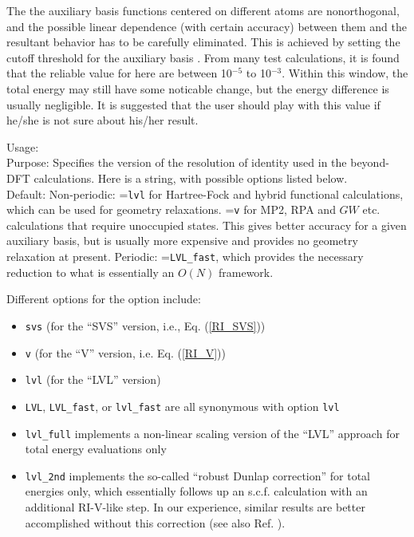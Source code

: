   The the auxiliary basis functions centered on different atoms are nonorthogonal,
  and the possible linear dependence (with certain accuracy) between them 
  and the resultant behavior has to be carefully eliminated. This is achieved by
  setting the cutoff threshold for the auxiliary basis .
  From many test calculations, it is found that the reliable value for 
   here are between 10$^{-5}$ to 10$^{-3}$. Within this window,
   the total energy may still have some noticable change, but the energy difference 
   is usually negligible. It is suggested that the user should play with this
   value if he/she is not sure about his/her result.


{ \noindent
  Usage:   \\[1.0ex]
  Purpose: Specifies the version of the resolution of identity used in the 
      beyond-DFT calculations. Here  is a string, with
      possible options listed below.
      \\[1.0ex]
  Default: Non-periodic: =\texttt{lvl} for Hartree-Fock
  and hybrid functional calculations, which can be used for geometry
  relaxations. =\texttt{v} for MP2, RPA and $GW$
  etc. calculations that require unoccupied states.  This gives better
  accuracy for a given auxiliary basis, but is usually more expensive
  and provides no geometry relaxation at present. Periodic: 
  =\texttt{LVL\_fast}, which provides the necessary
  reduction to what is essentially an $O(N)$ framework. \\
}

Different options for the  option include:
\begin{itemize}
  \item \texttt{svs} (for the ``SVS'' version, i.e.,
    Eq. (\ref{RI_SVS}))
  \item \texttt{v} (for the ``V'' version, i.e. Eq. (\ref{RI_V}))
  \item \texttt{lvl} (for the ``LVL'' version)
  \item \texttt{LVL}, \texttt{LVL\_fast}, or \texttt{lvl\_fast} are
    all synonymous with option \texttt{lvl}
  \item \texttt{lvl\_full} implements a non-linear scaling version of
    the ``LVL'' approach for total energy evaluations only
  \item \texttt{lvl\_2nd} implements the so-called ``robust Dunlap
    correction'' for total energies only, which essentially follows up
    an s.c.f. calculation with an additional RI-V-like step. In our
    experience, similar results are better accomplished without this
    correction (see also Ref. \cite{Ihrig2015}).
\end{itemize}

